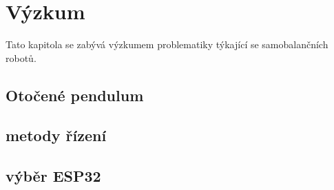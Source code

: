 \section{Výzkum}

Tato kapitola se zabývá výzkumem problematiky týkající se samobalančních robotů.

\subsection{Otočené pendulum}

\subsection{metody řízení}

\subsection{výběr ESP32}